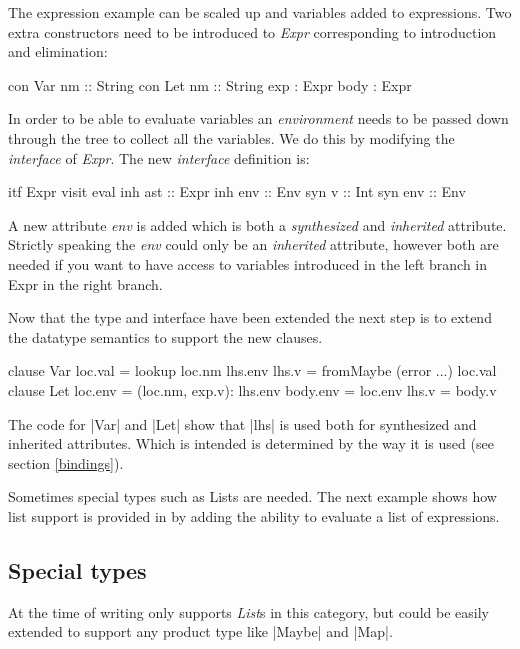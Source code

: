 The expression example can be scaled up and variables added to expressions. Two extra constructors need to be introduced to \emph{Expr} corresponding to introduction and elimination:	

\begin{code}
  con Var
    nm      :: String
  con Let
    nm      :: String
    exp     :  Expr
    body    :  Expr
\end{code}

In order to be able to evaluate variables an \emph{environment} needs to be passed down through the tree to collect all the variables. We do this by modifying the \emph{interface} of \emph{Expr}. The new \emph{interface} definition is:

\begin{code}
itf Expr
  visit eval 
    inh ast  :: Expr
    inh env  :: Env
    syn v    :: Int
    syn env  :: Env
\end{code}

A new attribute \emph{env} is added which is both a \emph{synthesized} and \emph{inherited} attribute. Strictly speaking the \emph{env} could only be an \emph{inherited} attribute, however both are needed if you want to have access to variables introduced in the left branch in Expr in the right branch.

Now that the type and interface have been extended the next step is to extend the datatype semantics to support the new clauses.

\begin{code}
   clause Var
     loc.val  = lookup loc.nm lhs.env
     lhs.v    = fromMaybe (error ...) loc.val
   clause Let
     loc.env   = (loc.nm, exp.v): lhs.env
     body.env  = loc.env
     lhs.v     = body.v
\end{code}

The code for |Var| and |Let| show that |lhs| is used both for synthesized and inherited attributes. Which is intended is determined by the way it is used (see section \ref{bindings}).

Sometimes special types such as Lists are needed. The next example shows how list support is provided in \rcore by adding the ability to evaluate a list of expressions.

\subsection{Special types}
At the time of writing \rcore only supports \emph{List}s in this category, but could be easily extended to support any product type like |Maybe| and |Map|.

